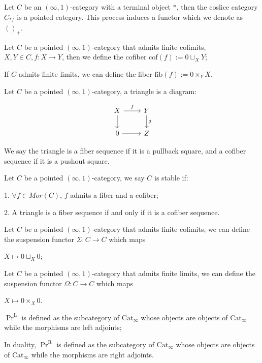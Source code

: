 \begin{theorem}
    Let $C$ be an $(\infty,1)$-category with a terminal object $*$, then the coslice category $C_{*/}$ is a pointed category. This process induces a functor which we denote as $()_+$.
\end{theorem}

\begin{definition}
    Let $C$ be a pointed $(\infty,1)$-category that admits finite colimits, $X,Y\in C,f: X\to Y$, then we define the cofiber $\text{cof}(f):=0 \sqcup_X Y$;
    
    If $C$ admits finite limits, we can define the fiber $\text{fib}(f):= 0\times_Y X$.
\end{definition}

\begin{definition}
    Let $C$ be a pointed $(\infty,1)$-category, a triangle is a diagram:

    \[
\begin{tikzcd}
X \ar[r,"f"] \ar[d] & Y \ar[d,"g"] \\
0 \ar[r] & Z
\end{tikzcd}
\]

We say the triangle is a fiber sequence if it is a pullback square, and a cofiber sequence if it is a pushout square.


\end{definition}

\begin{definition}
    Let $C$ be a pointed $(\infty,1)$-category, we say $C$ is stable if:

    1. $\forall f \in Mor(C)$, $f$ admits a fiber and a cofiber;

    2. A triangle is a fiber sequence if and only if it is a cofiber sequence.
\end{definition}



\begin{definition}
   Let $C$ be a pointed $(\infty,1)$-category that admits finite colimits, we can define the suspension functor $\Sigma:C\to C$ which maps

   $X\mapsto 0\sqcup_X0$;

   Let $C$ be a pointed $(\infty,1)$-category that admits finite limits, we can define the suspension functor $\Omega:C\to C$ which maps

   $X\mapsto 0\times_X0$.
\end{definition}

\begin{definition}
    $\operatorname{Pr}^{\mathrm{L}}$ is defined as the subcategory of $\text{Cat}_\infty$ whose objects are objects of $\text{Cat}_\infty$ while the morphisms are left adjoints;

    In duality, $\operatorname{Pr}^{\mathrm{R}}$ is defined as the subcategory of $\text{Cat}_\infty$ whose objects are objects of $\text{Cat}_\infty$ while the morphisms are right adjoints.
\end{definition}

